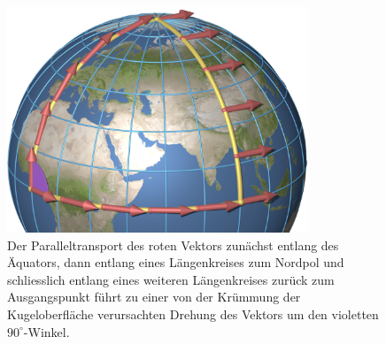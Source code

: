 %
%
%
\begin{figure}
\centering
\includegraphics[width=9cm]{chapters/000-einleitung/images/kruemmung.jpg}
\caption{Der Paralleltransport des roten Vektors zunächst entlang des
Äquators, dann entlang eines Längenkreises zum Nordpol und schliesslich
entlang eines weiteren Längenkreises zurück zum Ausgangspunkt führt zu
einer von der Krümmung der Kugeloberfläche verursachten Drehung des
Vektors um den violetten $90^\circ$-Winkel.
\label{buch:einleitung:fig:kruemmung}}
\end{figure}

